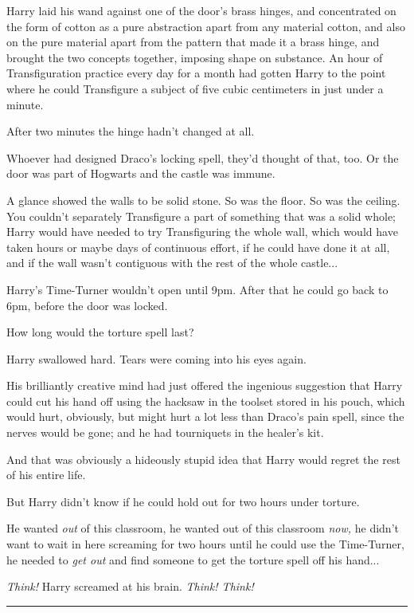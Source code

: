 Harry laid his wand against one of the door's brass hinges, and
concentrated on the form of cotton as a pure abstraction apart from any
material cotton, and also on the pure material apart from the pattern
that made it a brass hinge, and brought the two concepts together,
imposing shape on substance. An hour of Transfiguration practice every
day for a month had gotten Harry to the point where he could Transfigure
a subject of five cubic centimeters in just under a minute.

After two minutes the hinge hadn't changed at all.

Whoever had designed Draco's locking spell, they'd thought of that, too.
Or the door was part of Hogwarts and the castle was immune.

A glance showed the walls to be solid stone. So was the floor. So was
the ceiling. You couldn't separately Transfigure a part of something
that was a solid whole; Harry would have needed to try Transfiguring the
whole wall, which would have taken hours or maybe days of continuous
effort, if he could have done it at all, and if the wall wasn't
contiguous with the rest of the whole castle...

Harry's Time-Turner wouldn't open until 9pm. After that he could go back
to 6pm, before the door was locked.

How long would the torture spell last?

Harry swallowed hard. Tears were coming into his eyes again.

His brilliantly creative mind had just offered the ingenious suggestion
that Harry could cut his hand off using the hacksaw in the toolset
stored in his pouch, which would hurt, obviously, but might hurt a lot
less than Draco's pain spell, since the nerves would be gone; and he had
tourniquets in the healer's kit.

And that was obviously a hideously stupid idea that Harry would regret
the rest of his entire life.

But Harry didn't know if he could hold out for two hours under torture.

He wanted \emph{out} of this classroom, he wanted out of this classroom
\emph{now,} he didn't want to wait in here screaming for two hours until
he could use the Time-Turner, he needed to \emph{get out} and find
someone to get the torture spell off his hand...

\emph{Think!} Harry screamed at his brain. \emph{Think! Think!}

\begin{center}\rule{3in}{0.4pt}\end{center}

